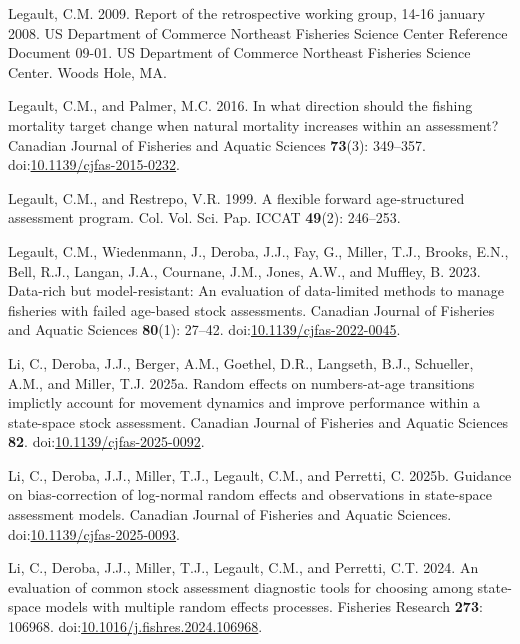 \documentclass[
  12pt,
]{article}
\newlength{\cslhangindent}
\newenvironment{CSLReferences}[2] %
 {\begin{list}{}{%
  \setlength{\itemindent}{0pt}
  \setlength{\leftmargin}{0pt}
  \setlength{\parsep}{0pt}
  \ifodd #1
   \setlength{\leftmargin}{\cslhangindent}
   \setlength{\itemindent}{-1\cslhangindent}
  \fi
  \setlength{\itemsep}{#2\baselineskip}}}
 {\end{list}}
\begin{document}
\begin{CSLReferences}{1}{0}
Legault, C.M. 2009. Report of the retrospective working group, 14-16
january 2008. US Department of Commerce Northeast Fisheries Science
Center Reference Document 09-01. US Department of Commerce Northeast
Fisheries Science Center. Woods Hole, MA.

Legault, C.M., and Palmer, M.C. 2016. In what direction should the
fishing mortality target change when natural mortality increases within
an assessment? Canadian Journal of Fisheries and Aquatic Sciences
\textbf{73}(3): 349--357.
doi:\href{https://doi.org/10.1139/cjfas-2015-0232}{10.1139/cjfas-2015-0232}.

Legault, C.M., and Restrepo, V.R. 1999. A flexible forward
age-structured assessment program. Col. Vol. Sci. Pap. ICCAT
\textbf{49}(2): 246--253.

Legault, C.M., Wiedenmann, J., Deroba, J.J., Fay, G., Miller, T.J.,
Brooks, E.N., Bell, R.J., Langan, J.A., Cournane, J.M., Jones, A.W., and
Muffley, B. 2023. Data-rich but model-resistant: An evaluation of
data-limited methods to manage fisheries with failed age-based stock
assessments. Canadian Journal of Fisheries and Aquatic Sciences
\textbf{80}(1): 27--42.
doi:\href{https://doi.org/10.1139/cjfas-2022-0045}{10.1139/cjfas-2022-0045}.

Li, C., Deroba, J.J., Berger, A.M., Goethel, D.R., Langseth, B.J.,
Schueller, A.M., and Miller, T.J. 2025a. Random effects on
numbers-at-age transitions implictly account for movement dynamics and
improve performance within a state-space stock assessment. Canadian
Journal of Fisheries and Aquatic Sciences \textbf{82}.
doi:\href{https://doi.org/10.1139/cjfas-2025-0092}{10.1139/cjfas-2025-0092}.

Li, C., Deroba, J.J., Miller, T.J., Legault, C.M., and Perretti, C.
2025b. Guidance on bias-correction of log-normal random effects and
observations in state-space assessment models. Canadian Journal of
Fisheries and Aquatic Sciences.
doi:\href{https://doi.org/10.1139/cjfas-2025-0093}{10.1139/cjfas-2025-0093}.

Li, C., Deroba, J.J., Miller, T.J., Legault, C.M., and Perretti, C.T.
2024. An evaluation of common stock assessment diagnostic tools for
choosing among state-space models with multiple random effects
processes. Fisheries Research \textbf{273}: 106968.
doi:\href{https://doi.org/10.1016/j.fishres.2024.106968}{10.1016/j.fishres.2024.106968}.


\end{CSLReferences}
\end{document}
